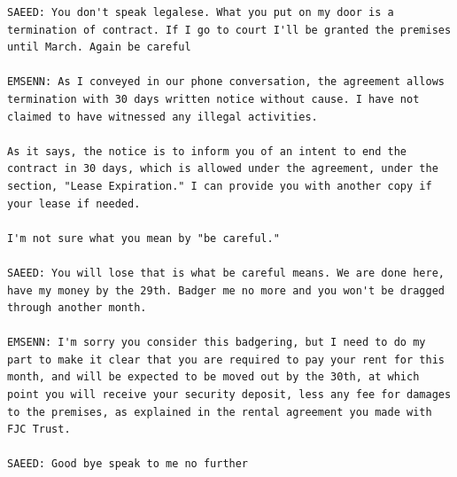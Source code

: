 \documentclass[11pt]{article}
\begin{document}
\begin{verbatim}
SAEED: You don't speak legalese. What you put on my door is a
termination of contract. If I go to court I'll be granted the premises
until March. Again be careful

EMSENN: As I conveyed in our phone conversation, the agreement allows
termination with 30 days written notice without cause. I have not
claimed to have witnessed any illegal activities.

As it says, the notice is to inform you of an intent to end the
contract in 30 days, which is allowed under the agreement, under the
section, "Lease Expiration." I can provide you with another copy if
your lease if needed.

I'm not sure what you mean by "be careful."

SAEED: You will lose that is what be careful means. We are done here,
have my money by the 29th. Badger me no more and you won't be dragged
through another month.

EMSENN: I'm sorry you consider this badgering, but I need to do my
part to make it clear that you are required to pay your rent for this
month, and will be expected to be moved out by the 30th, at which
point you will receive your security deposit, less any fee for damages
to the premises, as explained in the rental agreement you made with
FJC Trust.

SAEED: Good bye speak to me no further
\end{verbatim}
\end{document}
